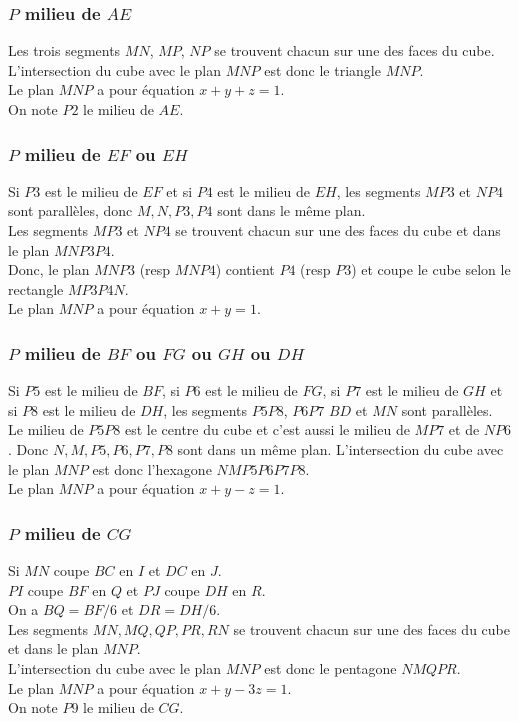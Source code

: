 \documentclass[a4paper,11pt]{book}
\begin{document}
\subsubsection{$P$ milieu de $AE$}
Les trois segments $MN$, $MP$, $NP$ se trouvent chacun sur une des faces du 
cube.\\
L'intersection du cube avec le plan $MNP$ est donc le triangle $MNP$.\\ 
Le plan $MNP$ a pour \'equation $x+y+z=1$.\\
On note $P2$ le milieu de $AE$.
\subsubsection{$P$ milieu de $EF$ ou $EH$}
Si $P3$ est le milieu de $EF$ et si $P4$ est le milieu de $EH$, les segments
$MP3$ et $NP4$ sont parall\`eles, donc $M,N,P3,P4$ sont dans le m\^eme plan.\\
Les segments $MP3$ et $NP4$  se trouvent chacun sur une des faces du 
cube et dans le plan $MNP3P4$.\\
Donc, le plan $MNP3$ (resp $MNP4$) contient $P4$ (resp $P3$) et coupe le 
cube selon le rectangle $MP3P4N$.\\ 
Le plan $MNP$ a pour \'equation $x+y=1$.
\subsubsection{$P$ milieu de $BF$ ou $FG$ ou $GH$ ou $DH$}
Si $P5$ est le milieu de $BF$, si $P6$ est le milieu de $FG$, si $P7$ est le 
milieu de $GH$ et si $P8$ est le milieu de $DH$, les segments $P5P8$, $P6P7$
$BD$ et $MN$  sont parall\`eles. Le milieu de $P5P8$ est le centre du cube et 
c'est aussi le milieu de $MP7$ et de $NP6$. Donc $N,M,P5,P6,P7,P8$ sont dans 
un m\^eme plan.  
L'intersection du cube avec le plan $MNP$ est donc l'hexagone  $NMP5P6P7P8$.\\ 
Le plan $MNP$ a pour \'equation $x+y-z=1$.
\subsubsection{$P$ milieu de $CG$}
Si $MN$ coupe $BC$ en $I$ et $DC$ en $J$.\\
$PI$ coupe $BF$ en $Q$ et $PJ$ coupe $DH$ en $R$.\\
On a $BQ=BF/6$ et  $DR=DH/6$.\\
Les segments $MN,MQ,QP,PR,RN$ se trouvent chacun sur une des faces du 
cube et dans le plan $MNP$.\\
L'intersection du cube avec le plan $MNP$ est donc le pentagone $NMQPR$.\\ 
Le plan $MNP$ a pour \'equation $x+y-3z=1$.\\
On note $P9$ le milieu de $CG$.
\end{document}

